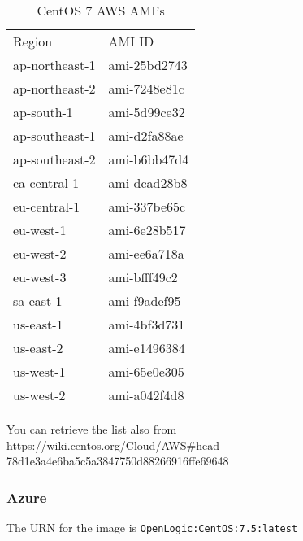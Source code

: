 \begin{table}[]
\centering
\begin{tabular}{ll}
Region         & AMI ID       \\
ap-northeast-1 & ami-25bd2743 \\
ap-northeast-2 & ami-7248e81c \\
ap-south-1     & ami-5d99ce32 \\
ap-southeast-1 & ami-d2fa88ae \\
ap-southeast-2 & ami-b6bb47d4 \\
ca-central-1   & ami-dcad28b8 \\
eu-central-1   & ami-337be65c \\
eu-west-1      & ami-6e28b517 \\
eu-west-2      & ami-ee6a718a \\
eu-west-3      & ami-bfff49c2 \\
sa-east-1      & ami-f9adef95 \\
us-east-1      & ami-4bf3d731 \\
us-east-2      & ami-e1496384 \\
us-west-1      & ami-65e0e305 \\
us-west-2      & ami-a042f4d8 \\
\end{tabular}
\caption{CentOS 7 AWS AMI's}
\label{centami}
\end{table}

You can retrieve the list also from \\
https://wiki.centos.org/Cloud/AWS\#head-78d1e3a4e6ba5c5a3847750d88266916ffe69648

\subsubsection{Azure}

The URN for the image is \texttt{OpenLogic:CentOS:7.5:latest}